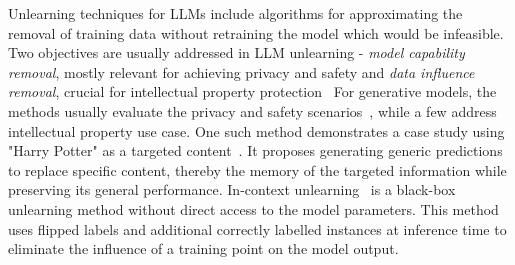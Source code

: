 \documentclass[conference]{IEEEtran}
\begin{document}
Unlearning techniques for LLMs include algorithms for approximating the removal of training data without retraining the model which would be infeasible. 
Two objectives are usually addressed in LLM unlearning - \textit{model capability removal}, mostly relevant for achieving privacy and safety and \textit{data influence removal}, crucial for intellectual property protection~\cite{liu_rethinking_2024}
For generative models, the methods usually evaluate the privacy and safety scenarios~\cite{jang_knowledge_2022,wu_depn_2023,lu_quark_2022}, while a few address intellectual property use case.
One such method demonstrates a case study using "Harry Potter" as a targeted content~\cite{eldan_whos_2023}. It proposes generating generic predictions to replace specific content, thereby the memory of the targeted information while preserving its general performance. 
In-context unlearning~\cite{pawelczyk_-context_2023} is a black-box unlearning method without direct access to the model parameters. This method uses flipped labels and additional correctly labelled instances at inference time to eliminate the influence of a training point on the model output.
\end{document}
